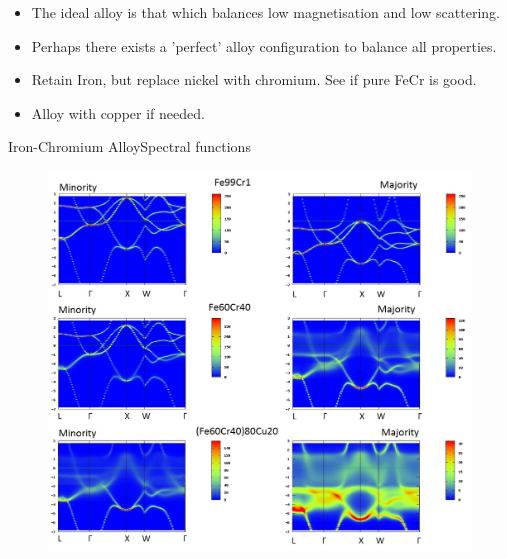 \documentclass{beamer}
\begin{document}
\begin{frame}
  \begin{itemize}
      \item {The ideal alloy is that which balances low magnetisation and low scattering.}
      \item{Perhaps there exists a 'perfect' alloy configuration to balance all properties.}
      \item{Retain Iron, but replace nickel with chromium. See if pure FeCr is good.}
      \item{Alloy with copper if needed.}
  \end{itemize}
\end{frame}
\begin{frame}{Iron-Chromium Alloy}{Spectral functions}
\begin{figure}[h!]
    \centering
    \begin{measuredfigure}
    \includegraphics[scale=0.20]{Fe60Cr40}
    \end{measuredfigure}
    \end{figure}
\end{frame}
\end{document}
